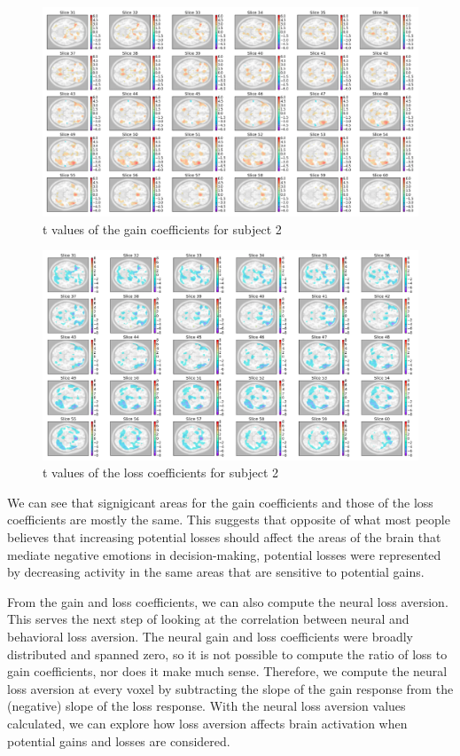 \documentclass[11pt]{article}
\begin{document}
\begin{figure}[H]
    \centering
        \includegraphics[scale=0.4]{figures/Regression2/t_gain_standard_sub2.png}
    \caption{t values of the gain coefficients for subject 2}
\end{figure}

\begin{figure}[H]
    \centering
        \includegraphics[scale=0.4]{figures/Regression2/t_loss_standard_sub2.png}
    \caption{t values of the loss coefficients for subject 2}
\end{figure}

We can see that signigicant areas for the gain coefficients and those of the 
loss coefficients are mostly the same. This suggests that opposite of what 
most people believes that increasing potential losses should affect the areas 
of the brain that mediate negative emotions in decision-making, potential 
losses were represented by decreasing activity in the same areas that are 
sensitive to potential gains.

From the gain and loss coefficients, we can also compute the neural loss
aversion. This serves the next step of looking at the correlation between
neural and behavioral loss aversion. The neural gain and loss coefficients
were broadly distributed and spanned zero, so it is not possible to compute
the ratio of loss to gain coefficients, nor does it make much sense.
Therefore, we compute the neural loss aversion at every voxel by subtracting
the slope of the gain response from the (negative) slope of the loss response.
With the neural loss aversion values calculated, we can explore how loss
aversion affects brain activation when potential gains and losses are
considered.
\end{document}
